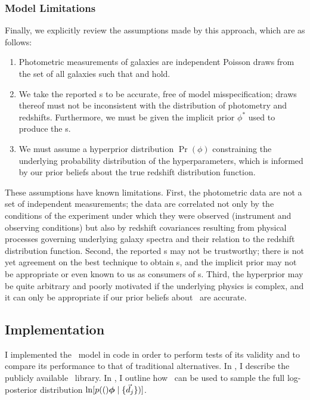 \subsubsection{Model Limitations}

Finally, we explicitly review the assumptions made by this approach, which are as follows:

\begin{enumerate}
	\item Photometric measurements of galaxies are independent Poisson draws from the set of all galaxies such that  and  hold.
	\item We take the reported \pzip s to be accurate, free of model misspecification; draws thereof must not be inconsistent with the distribution of photometry and redshifts.
	Furthermore, we must be given the implicit prior $\phi^{*}$ used to produce the \pzip s.
	\item We must assume a hyperprior distribution $\Pr(\phi)$ constraining the underlying probability distribution of the hyperparameters, which is informed by our prior beliefs about the true redshift distribution function.
\end{enumerate}

These assumptions have known limitations.  
First, the photometric data are not a set of independent measurements; the data are correlated not only by the conditions of the experiment under which they were observed (instrument and observing conditions) but also by redshift covariances resulting from physical processes governing underlying galaxy spectra and their relation to the redshift distribution function.
Second, the reported \pzip s may not be trustworthy; there is not yet agreement on the best technique to obtain \pzpdf s, and the implicit prior may not be appropriate or even known to us as consumers of \pzip s.  
Third, the hyperprior may be quite arbitrary and poorly motivated if the underlying physics is complex, and it can only be appropriate if our prior beliefs about \nz\ are accurate.

\subsection{Implementation}

I implemented the \Chippr\ model in code in order to perform tests of its validity and to compare its performance to that of traditional alternatives.
In , I describe the publicly available \chippr\ library.
In , I outline how \chippr\ can be used to sample the full log-posterior distribution $\ln[p((){\boldsymbol{\phi}} \mid \{\vec{d}_{j}\})]$.

